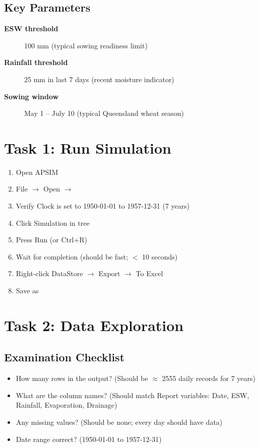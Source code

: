 \subsection{Key Parameters}

\begin{description}
  \item[\textbf{ESW threshold}] 100 mm (typical sowing readiness limit)
  \item[\textbf{Rainfall threshold}] 25 mm in last 7 days (recent moisture indicator)
  \item[\textbf{Sowing window}] May 1 -- July 10 (typical Queensland wheat season)
\end{description}

\section{Task 1: Run Simulation}

\begin{enumerate}
  \item Open APSIM
  \item File $\to$ Open $\to$ 
  \item Verify Clock is set to 1950-01-01 to 1957-12-31 (7 years)
  \item Click Simulation in tree
  \item Press Run (or Ctrl+R)
  \item Wait for completion (should be fast; $<$ 10 seconds)
  \item Right-click DataStore $\to$ Export $\to$ To Excel
  \item Save as 
\end{enumerate}

\section{Task 2: Data Exploration}

\subsection{Examination Checklist}

\begin{itemize}
  \item How many rows in the output? (Should be $\approx$ 2555 daily records for 7 years)
  \item What are the column names? (Should match Report variables: Date, ESW, Rainfall, Evaporation, Drainage)
  \item Any missing values? (Should be none; every day should have data)
  \item Date range correct? (1950-01-01 to 1957-12-31)
\end{itemize}

